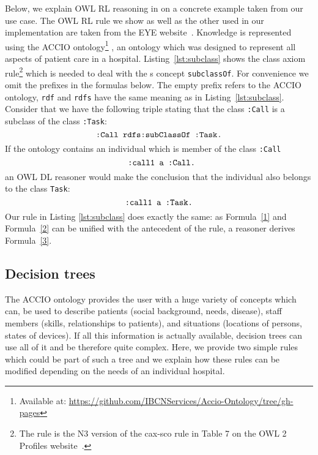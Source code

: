 Below, we explain OWL RL reasoning in \nthree on a concrete example taken from our use case.
The OWL RL rule we show as well as the other used in our implementation are taken from the EYE website~\cite{EYEowl}. %
Knowledge is represented using the ACCIO ontology\footnote{Available at: \url{https://github.com/IBCNServices/Accio-Ontology/tree/gh-pages}} \cite{accioont},
an ontology which was designed to represent all aspects of patient care in a hospital.
Listing~\ref{lst:subclass} shows 
the class axiom rule\footnote{The rule is the N3 version of the cax-sco rule in Table 7 on the OWL 2 Profiles website~\cite{OWLRL}.} which is needed 
to deal with the \rdf{}s concept  \verb!subclassOf!.
For convenience we omit the prefixes in the formulas below. The empty prefix refers to the ACCIO ontology, 
 \verb!rdf! and \verb!rdfs! have the same meaning as in Listing~\ref{lst:subclass}. Consider that we have the following %
 triple stating that the class \verb!:Call!
 is 
 a subclass of the class \verb!:Task!:
\begin{equation}
 \verb!:Call rdfs:subClassOf :Task.! \label{1}
\end{equation}
If the ontology %
contains an individual which is member of the class \verb!:Call!
\begin{equation} \verb! :call1 a :Call.! \label{2}\end{equation}
an OWL DL reasoner would make the conclusion that the individual also belongs to the class \verb!Task!: 
\begin{equation}
 \verb!:call1 a :Task.! \label{3}
\end{equation}
Our rule in Listing \ref{lst:subclass} does exactly the same: as Formula~\ref{1} and Formula~\ref{2} can be unified with the antecedent of the rule, a reasoner derives
Formula~\ref{3}. 
%


\subsection{Decision trees}
The ACCIO ontology provides the user with a huge variety of concepts which can, \eg be used to describe patients (social background, needs, disease), 
staff members (skills, relationships to patients), and situations (locations of persons, states of devices). If all this information is actually available, decision trees
can use all of it and be therefore quite complex. Here, we provide two simple rules which could be part of such a tree and we explain how these rules can
be modified depending on the needs of an individual hospital.
 
